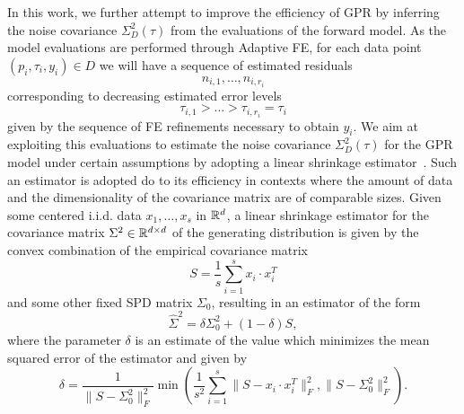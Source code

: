 In this work, we further attempt to improve the efficiency of GPR by inferring the noise covariance $\Sigma^2_D(\tau)$ from the evaluations of the forward model.\newline
As the model evaluations are performed through Adaptive FE, for each data point $(p_i, \tau_i, y_i) \in D$ we will have a sequence of estimated residuals 
\begin{equation}\label{eq:eval-seq}
     n_{i,1}, \dots, n_{i,r_i}
\end{equation} 
    corresponding to decreasing estimated error levels 
\begin{equation} \label{eq:tol-seq}
        \tau_{i,1} > \dots > \tau_{i,r_i} = \tau_i
\end{equation}
given by the sequence of FE refinements necessary to obtain $y_i$.
We aim at exploiting this evaluations to estimate the noise covariance $\Sigma^2_D(\tau)$ for the GPR model under certain assumptions by adopting a linear shrinkage estimator~\cite{LedoitWolf2004b}. 
Such an estimator is adopted do to its efficiency in contexts where the amount of data and the dimensionality of the covariance matrix are of comparable sizes. \newline
Given some centered i.i.d. data $x_1,\dots, x_s$ in $\mathbb{R}^d$, a linear shrinkage estimator for the covariance matrix $\Sigma^2 \in \mathbb{R}^{d\times d}$ of the generating distribution is given by the convex combination of the empirical covariance matrix 
\begin{equation}\label{eq:empirical-cov}
    S = \frac{1}{s} \sum_{i=1}^s x_i \cdot x_i^T
\end{equation}
and some other fixed SPD matrix $\Sigma_0$, resulting in an estimator of the form
\begin{equation}\label{eq:shrinkage-estimator-gen}
    \hat \Sigma^2 = \delta \Sigma^2_0 + (1-\delta) S,
\end{equation}
where the parameter $\delta$ is an estimate of the value which minimizes the mean squared error of the estimator and given by 
\begin{equation} \label{eq:shrinkage-delta}
    \delta = \frac{1}{\big \|S - \Sigma^2_0 \big \|_F^2} \min \left( \frac{1}{s^2} \sum_{i=1}^{s} \big \|S - x_i \cdot x_i^T\big \|_F^2, \big \|S - \Sigma^2_0 \big\|_F^2 \right).
\end{equation}\medbreak

